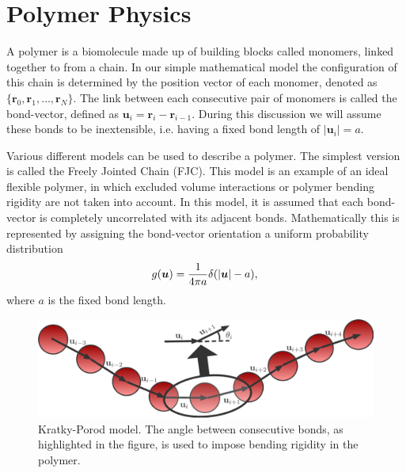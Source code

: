 \section{Polymer Physics}

A polymer is a biomolecule made up of building blocks called monomers, linked together to
from a chain. In our simple mathematical model the configuration of this chain is
determined by the position vector of each monomer, denoted as $\{\boldsymbol{r}_0,
    \boldsymbol{r}_1, \dots,
\boldsymbol{r}_N\}$.  The link between each consecutive pair of monomers is called the
bond-vector, defined as
$\boldsymbol{u}_i = \boldsymbol{r}_i - \boldsymbol{r}_{i-1}$. During this discussion we
will assume these bonds to be inextensible, i.e. having a fixed
bond length of $|\boldsymbol{u}_i| = a$.

Various different models can be used to describe a polymer. The simplest version is
called the Freely Jointed Chain (FJC). This model is an example of an ideal flexible
polymer, in which excluded volume interactions or polymer bending rigidity are not taken
into account.  In this model, it is assumed that each bond-vector is completely
uncorrelated with its adjacent bonds. Mathematically this is represented by assigning the
bond-vector orientation a uniform probability distribution
\begin{equation}
    g(\boldsymbol{u}) = \frac{1}{4 \pi a}
    \delta(|\boldsymbol{u}| - a), \\
\end{equation}
where $a$ is the fixed bond length.

\begin{figure}[h!]
    \centering
    \includegraphics[width=0.95\linewidth]{Figures/kratky.png}
    \vspace{0.3cm}
    \caption[Illustration of the Kratky-Porod model.]{Kratky-Porod model. The angle
    between consecutive bonds, as highlighted in the
    figure, is used to impose bending rigidity in the polymer.}
    \label{fig:kratky}
\end{figure}

